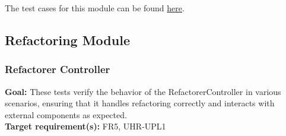 \documentclass[12pt, titlepage]{article}
\begin{document}
  \noindent The test cases for this module can be found
  \href{https://github.com/ssm-lab/capstone--source-code-optimizer/blob/new-poc/src/ecooptimizer/measurements/codecarbon_energy_meter.py}{here}.

  \subsection{Refactoring Module}

  \subsubsection{Refactorer Controller}

  \textbf{Goal:} These tests verify the behavior of the
  RefactorerController in various scenarios, ensuring that it handles
  refactoring correctly and interacts with external components as expected.\\

  \noindent \textbf{Target requirement(s):} FR5, UHR-UPL1~\cite{SRS} \\
\end{document}
